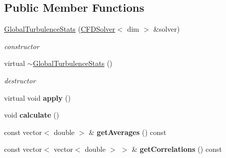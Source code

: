 \subsection*{Public Member Functions}
\begin{DoxyCompactItemize}
\item 
\hypertarget{classnatrium_1_1GlobalTurbulenceStats_aecbe59a8e8ec7687e4619a53bd9bfd5f}{
\hyperlink{classnatrium_1_1GlobalTurbulenceStats_aecbe59a8e8ec7687e4619a53bd9bfd5f}{GlobalTurbulenceStats} (\hyperlink{classnatrium_1_1CFDSolver}{CFDSolver}$<$ dim $>$ \&solver)}
\label{classnatrium_1_1GlobalTurbulenceStats_aecbe59a8e8ec7687e4619a53bd9bfd5f}

\begin{DoxyCompactList}\small\item\em constructor \item\end{DoxyCompactList}\item 
\hypertarget{classnatrium_1_1GlobalTurbulenceStats_acbd5928c1e3973d6e5bd042785c1210d}{
virtual \hyperlink{classnatrium_1_1GlobalTurbulenceStats_acbd5928c1e3973d6e5bd042785c1210d}{$\sim$GlobalTurbulenceStats} ()}
\label{classnatrium_1_1GlobalTurbulenceStats_acbd5928c1e3973d6e5bd042785c1210d}

\begin{DoxyCompactList}\small\item\em destructor \item\end{DoxyCompactList}\item 
\hypertarget{classnatrium_1_1GlobalTurbulenceStats_affafdf2db4bdc079db7f8b5c427c55d9}{
virtual void {\bfseries apply} ()}
\label{classnatrium_1_1GlobalTurbulenceStats_affafdf2db4bdc079db7f8b5c427c55d9}

\item 
\hypertarget{classnatrium_1_1GlobalTurbulenceStats_ade8230aad41c053d7e6796d7a55f76c0}{
void {\bfseries calculate} ()}
\label{classnatrium_1_1GlobalTurbulenceStats_ade8230aad41c053d7e6796d7a55f76c0}

\item 
\hypertarget{classnatrium_1_1GlobalTurbulenceStats_a6e76e3705fbd5f36a6e4d7cae35a36b9}{
const vector$<$ double $>$ \& {\bfseries getAverages} () const }
\label{classnatrium_1_1GlobalTurbulenceStats_a6e76e3705fbd5f36a6e4d7cae35a36b9}

\item 
\hypertarget{classnatrium_1_1GlobalTurbulenceStats_accd454e0c8dac1429b9ddc16d504cd89}{
const vector$<$ vector$<$ double $>$ $>$ \& {\bfseries getCorrelations} () const }
\label{classnatrium_1_1GlobalTurbulenceStats_accd454e0c8dac1429b9ddc16d504cd89}


\end{DoxyCompactItemize}
